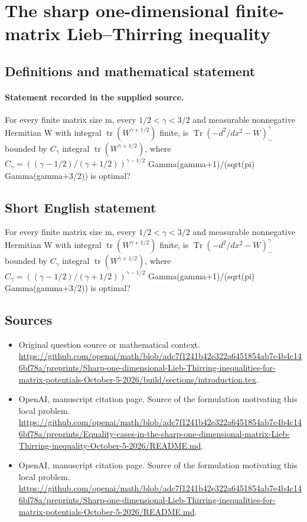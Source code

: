 \documentclass[11pt]{article}
\begin{document}
\section*{The sharp one-dimensional finite-matrix Lieb–Thirring inequality}\label{30007234}
\subsection{Definitions and mathematical statement}
\paragraph{Statement recorded in the supplied source.}
For every finite matrix size m, every $1/2<\gamma <3/2$ and measurable nonnegative Hermitian W with integral $\operatorname{tr}(W^{\gamma +1/2})$ finite, is $\operatorname{Tr}(-d^2/dx^2-W)_-^\gamma $ bounded by $C_\gamma $ integral $\operatorname{tr}(W^{\gamma +1/2})$, where $C_\gamma =((\gamma -1/2)/(\gamma +1/2))^{\gamma -1/2}$ Gamma(gamma+1)/(sqrt(pi) Gamma(gamma+3/2)) is optimal?
\subsection{Short English statement}
For every finite matrix size m, every $1/2<\gamma <3/2$ and measurable nonnegative Hermitian W with integral $\operatorname{tr}(W^{\gamma +1/2})$ finite, is $\operatorname{Tr}(-d^2/dx^2-W)_-^\gamma $ bounded by $C_\gamma $ integral $\operatorname{tr}(W^{\gamma +1/2})$, where $C_\gamma =((\gamma -1/2)/(\gamma +1/2))^{\gamma -1/2}$ Gamma(gamma+1)/(sqrt(pi) Gamma(gamma+3/2)) is optimal?
\subsection{Sources}
\begin{itemize}
\item[S1] Original question source or mathematical context.
\url{https://github.com/openai/math/blob/adc7f1241b42e322a6451854ab7e4b4c146bf78a/preprints/Sharp-one-dimensional-Lieb-Thirring-inequalities-for-matrix-potentials-October-5-2026/build/sections/introduction.tex}.
\item[S2] OpenAI, manuscript citation page. Source of the formulation motivating this local problem.
\url{https://github.com/openai/math/blob/adc7f1241b42e322a6451854ab7e4b4c146bf78a/preprints/Equality-cases-in-the-sharp-one-dimensional-matrix-Lieb-Thirring-inequality-October-5-2026/README.md}.
\item[S3] OpenAI, manuscript citation page. Source of the formulation motivating this local problem.
\url{https://github.com/openai/math/blob/adc7f1241b42e322a6451854ab7e4b4c146bf78a/preprints/Sharp-one-dimensional-Lieb-Thirring-inequalities-for-matrix-potentials-October-5-2026/README.md}.
\end{itemize}
\end{document}
